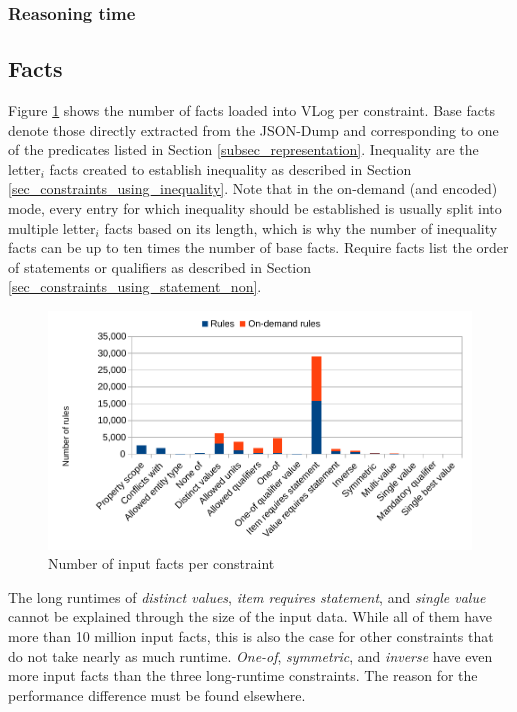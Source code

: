 \documentclass[hyperref,bachelorofscience,fleqn]{cgvpub}
\begin{document}
\subsubsection{Reasoning time}

\subsection{Facts}
Figure \ref{fig_facts} shows the number of facts loaded into VLog per constraint. Base facts denote those directly extracted from the JSON-Dump and corresponding to one of the predicates listed in Section \ref{subsec_representation}. Inequality are the letter\(_i\) facts created to establish inequality as described in Section \ref{sec_constraints_using_inequality}. Note that in the on-demand (and encoded) mode, every entry for which inequality should be established is usually split into multiple letter\(_i\) facts based on its length, which is why the number of inequality facts can be up to ten times the number of base facts. Require facts list the order of statements or qualifiers as described in Section \ref{sec_constraints_using_statement_non}.

\begin{figure}
\includegraphics[width=\linewidth]{images/Facts.pdf}
\caption{Number of input facts per constraint}\label{fig_facts}
\end{figure}

The long runtimes of \emph{distinct values}, \emph{item requires statement}, and \emph{single value} cannot be explained through the size of the input data. While all of them have more than 10 million input facts, this is also the case for other constraints that do not take nearly as much runtime. \emph{One-of}, \emph{symmetric}, and \emph{inverse} have even more input facts than the three long-runtime constraints. The reason for the performance difference must be found elsewhere.
\end{document}
